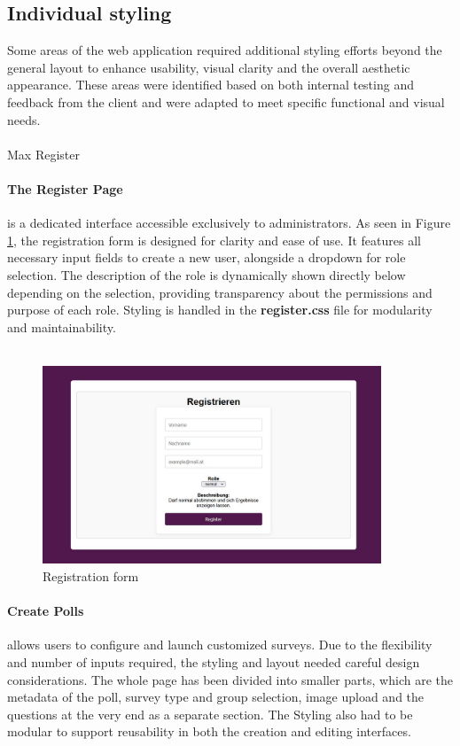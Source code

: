 \documentclass[a4paper,12pt]{report}
\begin{document}
\subsection{Individual styling}
Some areas of the web application required additional styling efforts beyond the general layout to enhance usability, visual clarity and the overall aesthetic appearance. These areas were identified based on both internal testing and feedback from the client and were adapted to meet specific functional and visual needs.\\\\

Max Register

\paragraph{The Register Page} is a dedicated interface accessible exclusively to administrators. As seen in Figure \ref{fig:register_view}, the registration form is designed for clarity and ease of use. It features all necessary input fields to create a new user, alongside a dropdown for role selection. The description of the role is dynamically shown directly below depending on the selection, providing transparency about the permissions and purpose of each role. Styling is handled in the \textbf{register.css} file for modularity and maintainability.\\\\ 
\begin{figure}[H]
\centering
\includegraphics[width=0.9\textwidth]{pics/register_view.jpg}
\caption{Registration form}
\label{fig:register_view}
\end{figure}
\paragraph{Create Polls} allows users to configure and launch customized surveys. Due to the flexibility and number of inputs required, the styling and layout needed careful design considerations. The whole page has been divided into smaller parts, which are the metadata of the poll, survey type and group selection, image upload and the questions at the very end as a separate section. The Styling also had to be modular to support reusability in both the creation and editing interfaces.\\\\
\end{document}
